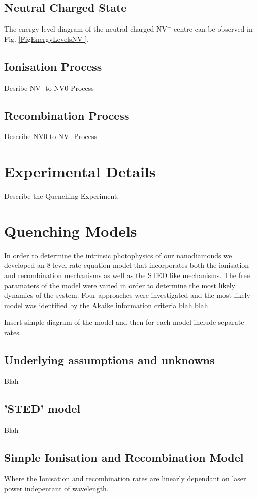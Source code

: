 \documentclass[preprint,prl,twocolumn]{revtex4}
\begin{document}
\subsection{Neutral Charged State}
The energy level diagram of the neutral charged NV$^-$ centre  can be observed in Fig. \ref{FigEnergyLevelsNV-}.
\subsection{Ionisation Process}
Desribe NV- to NV0 Process
\subsection{Recombination Process}
Describe NV0 to NV- Process

\section{Experimental Details}
Describe the Quenching Experiment.

\section{Quenching Models}
In order to determine the intrinsic photophysics of our nanodiamonds we developed an 8 level rate equation model that incorporates both the ionisation and recombination mechanisms as well as the STED like mechanisms. The free paramaters of the model were varied in order to determine the most likely dynamics of the system. Four approaches were investigated and the most likely model was identified by the Akaike information criteria blah blah

Insert simple diagram of the model and then for each model include separate rates.

\subsection{Underlying assumptions and unknowns}
Blah

\subsection{'STED' model}
Blah
\subsection{Simple Ionisation and Recombination Model}
Where the Ionisation and recombination rates are linearly dependant on laser power indepentant of wavelength.
\end{document}
